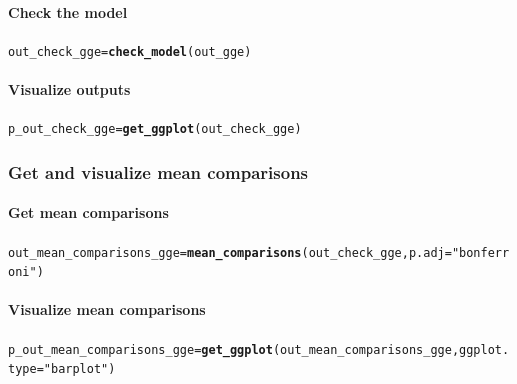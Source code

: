 \documentclass{book}\usepackage[]{graphicx}\usepackage[]{color}
\makeatletter
\newcommand{\hlstr}[1]{\textcolor[rgb]{0.192,0.494,0.8}{#1}}%
\newcommand{\hlstd}[1]{\textcolor[rgb]{0.345,0.345,0.345}{#1}}%
\newcommand{\hlkwb}[1]{\textcolor[rgb]{0.69,0.353,0.396}{#1}}%
\newcommand{\hlkwc}[1]{\textcolor[rgb]{0.333,0.667,0.333}{#1}}%
\newcommand{\hlkwd}[1]{\textcolor[rgb]{0.737,0.353,0.396}{\textbf{#1}}}%
\newenvironment{kframe}{%
 \def\at@end@of@kframe{}%
 \ifinner\ifhmode%
  \def\at@end@of@kframe{\end{minipage}}%
  \begin{minipage}{\columnwidth}%
 \fi\fi%
 \def\FrameCommand##1{\hskip\@totalleftmargin \hskip-\fboxsep
 \colorbox{shadecolor}{##1}\hskip-\fboxsep
     \hskip-\linewidth \hskip-\@totalleftmargin \hskip\columnwidth}%
 \MakeFramed {\advance\hsize-\width
   \@totalleftmargin\z@ \linewidth\hsize
   \@setminipage}}%
 {\par\unskip\endMakeFramed%
 \at@end@of@kframe}
\newenvironment{knitrout}{}{} %
\makeatother
\begin{document}
\paragraph{Check the model}
\begin{knitrout}
\color{fgcolor}\begin{kframe}
\begin{alltt}
\hlstd{out_check_gge} \hlkwb{=} \hlkwd{check_model}\hlstd{(out_gge)}
\end{alltt}
\end{kframe}
\end{knitrout}

\paragraph{Visualize outputs}
\begin{knitrout}
\color{fgcolor}\begin{kframe}
\begin{alltt}
\hlstd{p_out_check_gge} \hlkwb{=} \hlkwd{get_ggplot}\hlstd{(out_check_gge)}
\end{alltt}
\end{kframe}
\end{knitrout}

\subsubsection{Get and visualize mean comparisons}

\paragraph{Get mean comparisons}
\begin{knitrout}
\color{fgcolor}\begin{kframe}
\begin{alltt}
\hlstd{out_mean_comparisons_gge} \hlkwb{=} \hlkwd{mean_comparisons}\hlstd{(out_check_gge,} \hlkwc{p.adj} \hlstd{=} \hlstr{"bonferroni"}\hlstd{)}
\end{alltt}
\end{kframe}
\end{knitrout}

\paragraph{Visualize mean comparisons}
\begin{knitrout}
\color{fgcolor}\begin{kframe}
\begin{alltt}
\hlstd{p_out_mean_comparisons_gge} \hlkwb{=} \hlkwd{get_ggplot}\hlstd{(out_mean_comparisons_gge,} \hlkwc{ggplot.type} \hlstd{=} \hlstr{"barplot"}\hlstd{)}
\end{alltt}
\end{kframe}
\end{knitrout}
\end{document}
